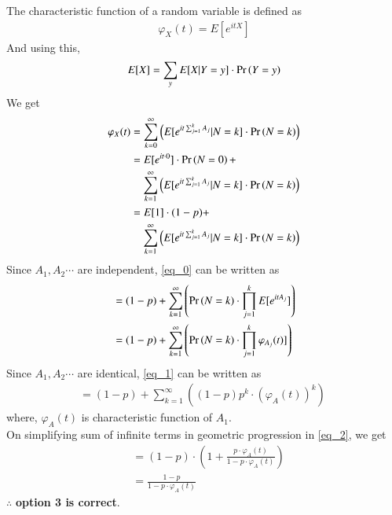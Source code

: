 \documentclass[journal,12pt,twocolumn]{IEEEtran}
\begin{document}
The characteristic function of a random variable is defined as
\begin{align}
    \varphi_X(t)=E[e^{itX}]
\end{align}
And using this,
\begin{align}
    E[X]=\sum_{y} E[X|Y=y]\cdot \Pr\left(Y=y\right)
\end{align}
We get 
\begin{align}
    \varphi_X(t)&=\sum_{k=0}^{\infty}\left(E[e^{it\sum_{j=1}^{k} A_j}
    |N=k]\cdot \pr{N=k}\right)\\
    &\begin{multlined}
    =E[e^{it\cdot 0}]\cdot \pr{N=0}+\\
    \sum_{k=1}^{\infty}\left(E[e^{it\sum_{j=1}^{k} A_j}
    |N=k]\cdot \pr{N=k}\right)
    \end{multlined}\\
    &\begin{multlined}
    =E[1]\cdot (1-p)+\\
    \sum_{k=1}^{\infty}\left(E[e^{it\sum_{j=1}^{k} A_j}|N=k]\cdot \pr{N=k}\right) \label{eq_0}
    \end{multlined}\\
\end{align}
Since $A_1,A_2\cdots$ are independent, \eqref{eq_0} can be written as
\begin{align}
    &=(1-p)+\sum_{k=1}^{\infty}\left(\Pr\left(N=k\right)\cdot\prod_{j=1}^k E[e^{itA_j}]\right) \\
    &=(1-p)+\sum_{k=1}^{\infty}\left(\Pr\left(N=k\right)\cdot\prod_{j=1}^k \varphi_{A_j}(t)]\right) \label{eq_1}
\end{align}
Since $A_1,A_2\cdots$ are identical, \eqref{eq_1} can be written as
\begin{align}
    =(1-p)+\sum_{k=1}^{\infty}\left((1-p)p^k\cdot(\varphi_{A}(t))^k\right)\;\label{eq_2}
\end{align}
where, $\varphi_{A}(t)$ is characteristic function of $A_1$.\\
On simplifying sum of infinite terms in geometric progression in \eqref{eq_2}, we get
\begin{align}
    &=(1-p)\cdot \left(1+\frac{p\cdot \varphi_A(t)}{1-p\cdot \varphi_A(t)}\right)\\
    &=\frac{1-p}{1-p\cdot \varphi_A(t) }
\end{align}
$\therefore$ \textbf{option 3 is correct}.\\
\end{document}
